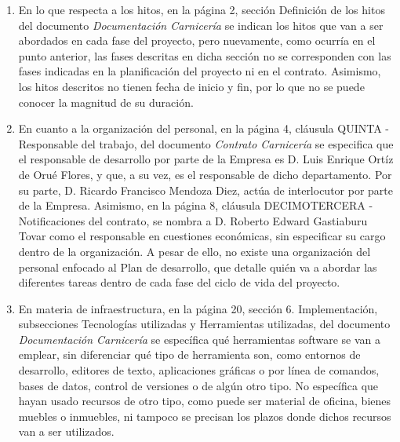 \documentclass[a4paper,12pt]{report}
\begin{document}
\begin{enumerate}
\begin{enumerate}
            \item En lo que respecta a los hitos, en la página 2, sección Definición de los
            hitos del documento \textit{Documentación Carnicería} se indican los hitos que 
            van a ser abordados en cada fase del proyecto, pero nuevamente, como ocurría
            en el punto anterior, las fases descritas en dicha sección no se corresponden
            con las fases indicadas en la planificación del proyecto ni en el contrato.
            Asimismo, los hitos descritos no tienen fecha de inicio y fin, por lo que 
            no se puede conocer la magnitud de su duración.\label{hitos}
            
            \item En cuanto a la organización del personal, en la página 4, cláusula QUINTA -
            Responsable del trabajo, del documento \textit{Contrato Carnicería} se especifica que el
            responsable de desarrollo por parte de la Empresa es D. Luis Enrique Ortíz de Orué
            Flores, y que, a su vez, es el responsable de dicho departamento. Por su parte, D. 
            Ricardo Francisco Mendoza Diez, actúa de interlocutor por parte de la Empresa.
            Asimismo, en la página 8, cláusula DECIMOTERCERA - Notificaciones del contrato, 
            se nombra a D. Roberto Edward Gastiaburu Tovar como el responsable en cuestiones
            económicas, sin especificar su cargo dentro de la organización. A pesar de ello, no 
            existe una organización del personal enfocado al Plan de desarrollo, que detalle 
            quién va a abordar las diferentes tareas dentro de cada fase del ciclo de
            vida del proyecto.\label{organizacion}
            
            \item En materia de infraestructura, en la página 20, sección 6. Implementación,
            subsecciones Tecnologías utilizadas y Herramientas utilizadas, del documento
            \textit{Documentación Carnicería} se específica qué herramientas software se van a
            emplear, sin diferenciar qué tipo de herramienta son, como entornos de desarrollo,
            editores de texto, aplicaciones gráficas o por línea de comandos, bases de datos,
            control de versiones o de algún otro tipo. No específica que hayan usado
            recursos de otro tipo, como puede ser material de oficina, bienes muebles o 
            inmuebles, ni tampoco se precisan los plazos donde dichos recursos van a ser
            utilizados.\label{infraestructura}
            

\end{enumerate}
\end{enumerate}
\end{document}
